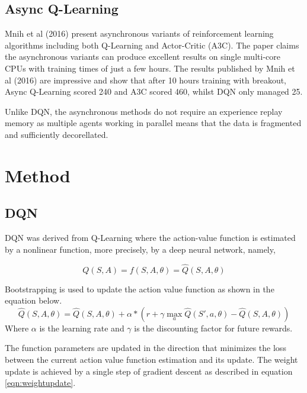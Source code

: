 \documentclass{article}
\begin{document}
\subsection{Async Q-Learning}

Mnih et al (2016) present asynchronous variants of reinforcement learning algorithms including both Q-Learning and Actor-Critic (A3C).
The paper claims the asynchronous variants can produce excellent results on single multi-core CPUs with training times of just a few hours. The results published by Mnih et al (2016) are impressive and show that after 10 hours training with breakout, Async Q-Learning scored 240 and A3C scored 460, whilst DQN only managed 25.

Unlike DQN, the asynchronous methods do not require an experience replay memory as multiple agents working in parallel means that the data is fragmented and sufficiently decorellated.

\section{Method}
\subsection{DQN}

DQN was derived from Q-Learning where the action-value function is estimated by a nonlinear function, more precisely, by a deep neural network, namely,

\begin{equation}
Q(S,A) = f(S,A,\theta) = \hat{Q}(S,A,\theta)
\end{equation}

Bootstrapping is used to update the action value function as shown in the equation below.
\begin{equation}
\hat{Q}(S,A,\theta) = \hat{Q}(S,A,\theta) + \alpha * \left( r + \gamma \max_{a} \hat{Q}(S',a,\theta) - \hat{Q}(S,A,\theta) \right)
\end{equation}
Where $\alpha$ is the learning rate and $\gamma$ is the discounting factor for future rewards.

The function parameters are updated in the direction that minimizes the loss between the current action value function estimation and its update. The weight update is achieved by a single step of gradient descent as described in equation \ref{eqn:weightupdate}.
\end{document}
